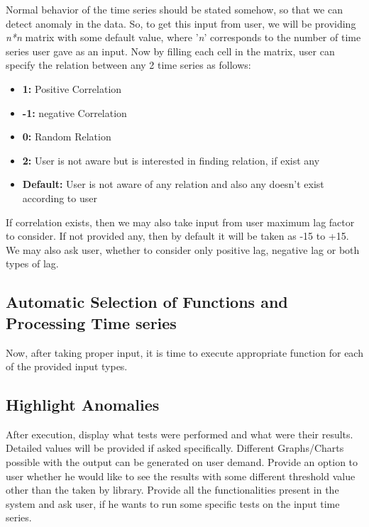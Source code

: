 Normal behavior of the time series should be stated somehow, so that we can detect anomaly in the data. So, to get this input from user, we will be providing \textit{n*n} matrix with some default value, where '\textit{n}' corresponds to the number of time series user gave as an input. Now by filling each cell in the matrix, user can specify the relation between any 2 time series as follows:


\begin{itemize}

\item \textbf{1:} Positive Correlation
\item \textbf{-1:} negative Correlation
\item \textbf{0:} Random Relation
\item \textbf{2:} User is not aware but is interested in finding relation, if exist any
\item \textbf{Default:} User is not aware of any relation and also any doesn’t exist according to user

\end{itemize}

If correlation exists, then we may also take input from user maximum lag factor to consider. If not provided any, then by default it will be taken as -15 to +15. We may also ask user, whether to consider only positive lag, negative lag or both types of lag.

\subsection {Automatic Selection of Functions and Processing Time series}

Now, after taking proper input, it is time to execute appropriate function for each of the provided input types.

\subsection {Highlight Anomalies}

After execution, display what tests were performed and what were their results. Detailed values will be provided if asked specifically. Different Graphs/Charts possible with the output can be generated on user demand. Provide an option to user whether he would like to see the results with some different threshold value other than the taken by library. Provide all the functionalities present in the system and ask user, if he wants to run some specific tests on the input time series.

